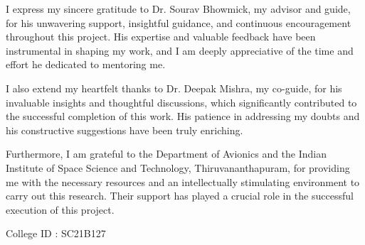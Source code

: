 I express my sincere gratitude to Dr. Sourav Bhowmick, my advisor and guide, for his unwavering support, insightful guidance, and continuous encouragement throughout this project. His expertise and valuable feedback have been instrumental in shaping my work, and I am deeply appreciative of the time and effort he dedicated to mentoring me.

I also extend my heartfelt thanks to Dr. Deepak Mishra, my co-guide, for his invaluable insights and thoughtful discussions, which significantly contributed to the successful completion of this work. His patience in addressing my doubts and his constructive suggestions have been truly enriching.

Furthermore, I am grateful to the Department of Avionics and the Indian Institute of Space Science and Technology, Thiruvananthapuram, for providing me with the necessary resources and an intellectually stimulating environment to carry out this research. Their support has played a crucial role in the successful execution of this project.



\vspace{15mm}
\hfill \Author \hspace{5mm}

\hfill {College ID : SC21B127} \hspace{3mm}

